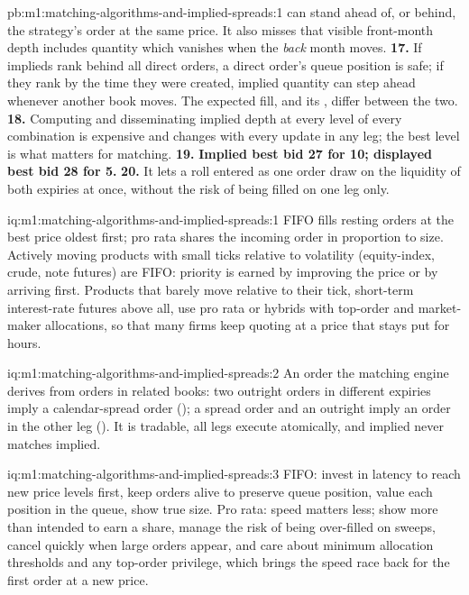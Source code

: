 \begin{solution}{pb:m1:matching-algorithms-and-implied-spreads:1}
can stand ahead of, or behind, the strategy's order at the same price. It
also misses that visible front-month depth includes quantity which vanishes
when the \emph{back} month moves.
\textbf{17.} If implieds rank behind all direct orders, a direct order's
queue position is safe; if they rank by the time they were created, implied
quantity can step ahead whenever another book moves. The expected fill, and
its , differ between the two.
\textbf{18.} Computing and disseminating implied depth at every level of
every combination is expensive and changes with every update in any leg;
the best level is what matters for matching.
\textbf{19.} \textbf{Implied best bid 27 for 10; displayed best bid 28 for 5.}
\textbf{20.} It lets a roll entered as one order draw on the liquidity of
both expiries at once, without the risk of being filled on one leg only.
\end{solution}

\begin{solution}{iq:m1:matching-algorithms-and-implied-spreads:1}
FIFO fills resting orders at the best price oldest first; pro rata shares
the incoming order in proportion to size. Actively moving products with
small ticks relative to volatility (equity-index, crude, note futures) are
FIFO: priority is earned by improving the price or by arriving first.
Products that barely move relative to their tick, short-term interest-rate
futures above all, use pro rata or hybrids with top-order and
market-maker allocations, so that many firms keep quoting at a price that
stays put for hours.
\end{solution}

\begin{solution}{iq:m1:matching-algorithms-and-implied-spreads:2}
An order the matching engine derives from orders in related books: two
outright orders in different expiries imply a calendar-spread order
(); a spread order and an outright imply an order in the other leg
(). It is tradable, all legs execute atomically, and implied
never matches implied.
\end{solution}

\begin{solution}{iq:m1:matching-algorithms-and-implied-spreads:3}
FIFO: invest in latency to reach new price levels first, keep orders alive to
preserve queue position, value each position in the queue, show true size.
Pro rata: speed matters less; show more than intended to earn a share,
manage the risk of being over-filled on sweeps, cancel quickly when large
orders appear, and care about minimum allocation thresholds and any
top-order privilege, which brings the speed race back for the first order at
a new price.
\end{solution}

